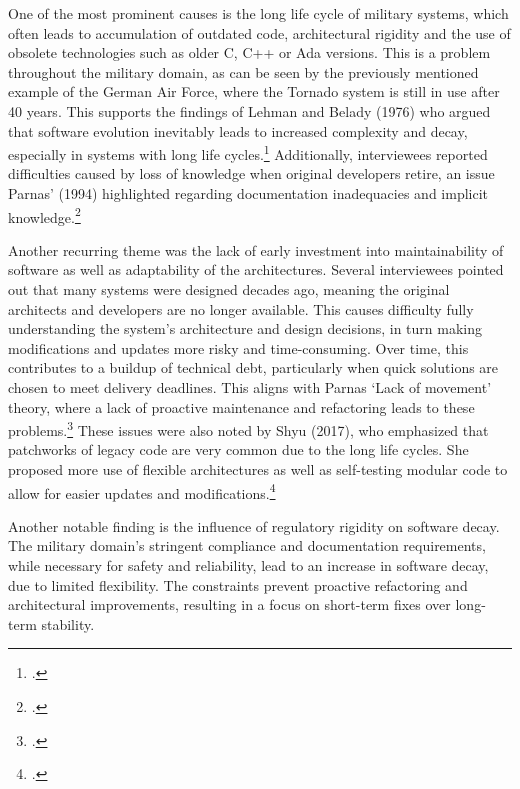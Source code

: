 One of the most prominent causes is the long life cycle of military systems, which often leads to accumulation of outdated code, architectural rigidity and the use of obsolete technologies such as older C, C++ or Ada versions.
This is a problem throughout the military domain, as can be seen by the previously mentioned example of the German Air Force, where the Tornado system is still in use after 40 years.
This supports the findings of Lehman and Belady (1976) who argued that software evolution inevitably leads to increased complexity and decay, especially in systems with long life cycles.\footcite[228]{beladyModelLargeProgram1976}
Additionally, interviewees reported difficulties caused by loss of knowledge when original developers retire, an issue Parnas' (1994) highlighted regarding documentation inadequacies and implicit knowledge.\footcite[280-281]{296790}

Another recurring theme was the lack of early investment into maintainability of software as well as adaptability of the architectures. Several interviewees pointed out that many systems were designed decades ago, meaning the original architects and developers are no longer available.
This causes difficulty fully understanding the system's architecture and design decisions, in turn making modifications and updates more risky and time-consuming. 
Over time, this contributes to a buildup of technical debt, particularly when quick solutions are chosen to meet delivery deadlines.
This aligns with Parnas `Lack of movement' theory, where a lack of proactive maintenance and refactoring leads to these problems.\footcite[280]{296790}
These issues were also noted by Shyu (2017), who emphasized that patchworks of legacy code are very common due to the long life cycles. She proposed more use of flexible architectures as well as self-testing modular code to allow for easier updates and modifications.\footcite[15-17]{shyu2017military}

Another notable finding is the influence of regulatory rigidity on software decay. The military domain's stringent compliance and documentation requirements, while necessary for safety and reliability, lead to an increase in software decay, due to limited flexibility.
The constraints prevent proactive refactoring and architectural improvements, resulting in a focus on short-term fixes over long-term stability.

